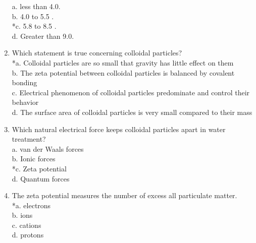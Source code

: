 \begin{enumerate}
a. less than 4.0.\\
b. 4.0 to 5.5 .\\
*c. 5.8 to 8.5 .\\
d. Greater than 9.0.\\
\item Which statement is true concerning colloidal particles?\\
*a. Colloidal particles are so small that gravity has little effect on them\\
b. The zeta potential between colloidal particles is balanced by covalent bonding\\
c. Electrical phenomenon of colloidal particles predominate and control their behavior\\
d. The surface area of colloidal particles is very small compared to their mass\\
\item Which natural electrical force keeps colloidal particles apart in water treatment?\\
a. van der Waals forces\\
b. Ionic forces\\
*c. Zeta potential\\
d. Quantum forces\\
\item The zeta potential measures the number of excess all particulate matter.\\
*a. electrons\\
b. ions\\
c. cations\\
d. protons\\
\end{enumerate}
